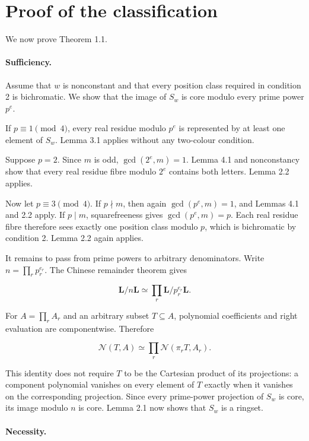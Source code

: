 \documentclass[11pt]{article}
\theoremstyle{remark}
\numberwithin{equation}{section}
\begin{document}
\section{Proof of the classification}

We now prove Theorem 1.1.

\paragraph{Sufficiency.}

Assume that $w$ is nonconstant and that every position class required in
condition 2 is bichromatic. We show that the image of $S_w$ is core modulo
every prime power $p^e$.

If $p\equiv1\pmod4$, every real residue modulo $p^e$ is represented by at
least one element of $S_w$. Lemma 3.1 applies without any two-colour
condition.

Suppose $p=2$. Since $m$ is odd,
$\gcd(2^e,m)=1$. Lemma 4.1 and nonconstancy show that every real residue
fibre modulo $2^e$ contains both letters. Lemma 2.2 applies.

Now let $p\equiv3\pmod4$. If $p\nmid m$, then again
$\gcd(p^e,m)=1$, and Lemmas 4.1 and 2.2 apply. If $p\mid m$, squarefreeness
gives $\gcd(p^e,m)=p$. Each real residue fibre therefore sees exactly one
position class modulo $p$, which is bichromatic by condition 2. Lemma 2.2
again applies.

It remains to pass from prime powers to arbitrary denominators. Write
$n=\prod_rp_r^{e_r}$. The Chinese remainder theorem gives

\[
\mathbf L/n\mathbf L
\simeq\prod_r\mathbf L/p_r^{e_r}\mathbf L.
\]

For $A=\prod_rA_r$ and an arbitrary subset $T\subseteq A$, polynomial
coefficients and right evaluation are componentwise. Therefore

\[
\mathcal N(T,A)
\simeq
\prod_r\mathcal N(\pi_rT,A_r).
\]

This identity does not require $T$ to be the Cartesian product of its
projections: a component polynomial vanishes on every element of $T$ exactly
when it vanishes on the corresponding projection. Since every prime-power
projection of $S_w$ is core, its image modulo $n$ is core. Lemma 2.1 now
shows that $S_w$ is a ringset.

\paragraph{Necessity.}
\end{document}
